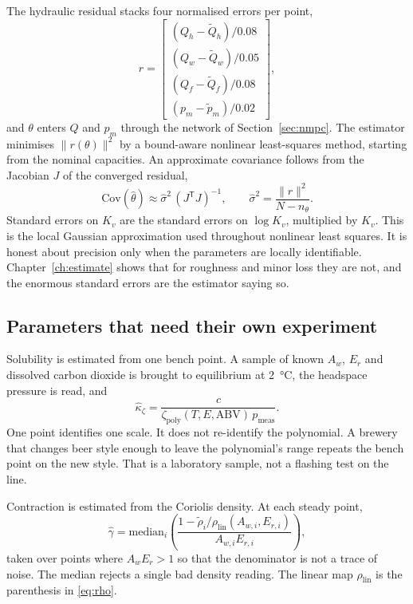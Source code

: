 The hydraulic residual stacks four normalised errors per point,
\begin{equation}
\label{eq:resid}
r
=
\begin{bmatrix}
(Q_h-\tilde Q_h)/0.08 \\
(Q_w-\tilde Q_w)/0.05 \\
(Q_f-\tilde Q_f)/0.08 \\
(p_m-\tilde p_m)/0.02
\end{bmatrix},
\end{equation}
and $\theta$ enters $Q$ and $p_m$ through the network of Section~\ref{sec:nmpc}. The estimator minimises $\|r(\theta)\|^{2}$ by a bound-aware nonlinear least-squares method, starting from the nominal capacities. An approximate covariance follows from the Jacobian $J$ of the converged residual,
\begin{equation}
\label{eq:cov}
\mathrm{Cov}(\hat\theta)
\approx
\hat\sigma^{2}\,(J^{\mathsf T}J)^{-1},
\qquad
\hat\sigma^{2}
=
\frac{\|r\|^{2}}{N-n_{\theta}}.
\end{equation}
Standard errors on $K_v$ are the standard errors on $\log K_v$, multiplied by $K_v$. This is the local Gaussian approximation used throughout nonlinear least squares. It is honest about precision only when the parameters are locally identifiable. Chapter~\ref{ch:estimate} shows that for roughness and minor loss they are not, and the enormous standard errors are the estimator saying so.

\subsection{Parameters that need their own experiment}

Solubility is estimated from one bench point. A sample of known $A_w$, $E_r$ and dissolved carbon dioxide is brought to equilibrium at \SI{2}{\celsius}, the headspace pressure is read, and
\begin{equation}
\label{eq:kappahat}
\hat\kappa_{\zeta}
=
\frac{c}{\zeta_{\mathrm{poly}}(T,E,\mathrm{ABV})\,p_{\mathrm{meas}}}.
\end{equation}
One point identifies one scale. It does not re-identify the polynomial. A brewery that changes beer style enough to leave the polynomial's range repeats the bench point on the new style. That is a laboratory sample, not a flashing test on the line.

Contraction is estimated from the Coriolis density. At each steady point,
\begin{equation}
\label{eq:gammahat}
\hat\gamma
=
\mathrm{median}_{i}
\left(
\frac{1 - \tilde\rho_i/\rho_{\mathrm{lin}}(A_{w,i},E_{r,i})}{A_{w,i}E_{r,i}}
\right),
\end{equation}
taken over points where $A_w E_r > 1$ so that the denominator is not a trace of noise. The median rejects a single bad density reading. The linear map $\rho_{\mathrm{lin}}$ is the parenthesis in \eqref{eq:rho}.

